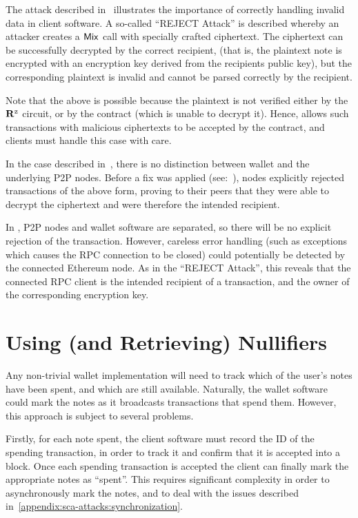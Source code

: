 The attack described in~\cite[Section 4.2.1]{tramerremote} illustrates the importance of correctly handling invalid data in client software. A so-called ``REJECT Attack'' is described whereby an attacker creates a $\mathsf{Mix}$ call with specially crafted ciphertext. The ciphertext can be successfully decrypted by the correct recipient, (that is, the plaintext note is encrypted with an encryption key derived from the recipients public key), but the corresponding plaintext is invalid and cannot be parsed correctly by the recipient.

\begin{notebox}
Note that the above is possible because the plaintext is not verified either by the $\mathbf{R}^{\texttt{z}}$ circuit, or by the contract (which is unable to decrypt it). Hence, \zeth{} allows such transactions with malicious ciphertexts to be accepted by the \mixer{} contract, and clients must handle this case with care.
\end{notebox}

In the case described in~\cite{tramerremote}, there is no distinction between wallet and the underlying P2P nodes.  Before a fix was applied (see:~\cite{zcash-remote-sca-fix-announcement}), nodes explicitly rejected transactions of the above form, proving to their peers that they were able to decrypt the ciphertext and were therefore the intended recipient.

In \zeth{}, P2P nodes and wallet software are separated, so there will be no explicit rejection of the transaction. However, careless error handling (such as exceptions which causes the RPC connection to be closed) could potentially be detected by the connected Ethereum node. As in the ``REJECT Attack'', this reveals that the connected RPC client is the intended recipient of a transaction, and the owner of the corresponding encryption key.

\section{Using (and Retrieving) Nullifiers}\label{appendix:sca-attacks:nullifiers}

Any non-trivial wallet implementation will need to track which of the user's \zeth{} notes have been spent, and which are still available. Naturally, the wallet software could mark the notes as it broadcasts transactions that spend them. However, this approach is subject to several problems.

Firstly, for each note spent, the client software must record the ID of the spending transaction, in order to track it and confirm that it is accepted into a block. Once each spending transaction is accepted the client can finally mark the appropriate \zeth{} notes as ``spent''. This requires significant complexity in order to asynchronously mark the notes, and to deal with the issues described in~\cref{appendix:sca-attacks:synchronization}.

